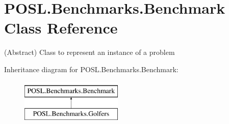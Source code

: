 \hypertarget{classPOSL_1_1Benchmarks_1_1Benchmark}{}\section{P\+O\+S\+L.\+Benchmarks.\+Benchmark Class Reference}
\label{classPOSL_1_1Benchmarks_1_1Benchmark}


(Abstract) Class to represent an instance of a problem  


Inheritance diagram for P\+O\+S\+L.\+Benchmarks.\+Benchmark\+:\begin{figure}[H]
\begin{center}
\leavevmode
\includegraphics[height=2.000000cm]{classPOSL_1_1Benchmarks_1_1Benchmark}
\end{center}
\end{figure}
